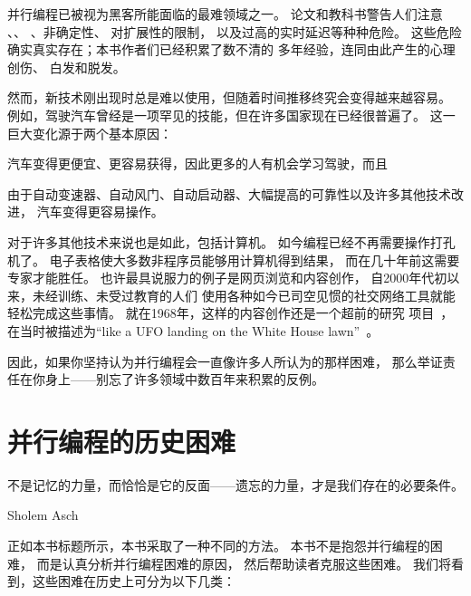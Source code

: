 
%

并行编程已被视为黑客所能面临的最难领域之一。
论文和教科书警告人们注意 、、
、非确定性、
 对扩展性的限制，
以及过高的实时延迟等种种危险。
这些危险确实真实存在；本书作者们已经积累了数不清的
多年经验，连同由此产生的心理创伤、
白发和脱发。

然而，新技术刚出现时总是难以使用，但随着时间推移终究会变得越来越容易。
例如，驾驶汽车曾经是一项罕见的技能，但在许多国家现在已经很普遍了。
这一巨大变化源于两个基本原因：
\begin{enumerate*}[(1)]
\item 汽车变得更便宜、更容易获得，因此更多的人有机会学习驾驶，而且
\item 由于自动变速器、自动风门、自动启动器、大幅提高的可靠性以及许多其他技术改进，
汽车变得更容易操作。
\end{enumerate*}

对于许多其他技术来说也是如此，包括计算机。
如今编程已经不再需要操作打孔机了。
电子表格使大多数非程序员能够用计算机得到结果，
而在几十年前这需要专家才能胜任。
也许最具说服力的例子是网页浏览和内容创作，
自2000年代初以来，未经训练、未受过教育的人们
使用各种如今已司空见惯的社交网络工具就能轻松完成这些事情。
就在1968年，这样的内容创作还是一个超前的研究
项目~\cite{DouglasEngelbart1968}，
在当时被描述为``like a UFO landing on the White House lawn''~\cite{ScottGriffen2000}。

因此，如果你坚持认为并行编程会一直像许多人所认为的那样困难，
那么举证责任在你身上——别忘了许多领域中数百年来积累的反例。

\section{并行编程的历史困难}
\label{sec:intro:Historic Parallel Programming Difficulties}
%
\epigraph{不是记忆的力量，而恰恰是它的反面——遗忘的力量，才是我们存在的必要条件。}
	 {Sholem Asch}

正如本书标题所示，本书采取了一种不同的方法。
本书不是抱怨并行编程的困难，
而是认真分析并行编程困难的原因，
然后帮助读者克服这些困难。
我们将看到，这些困难在历史上可分为以下几类：

